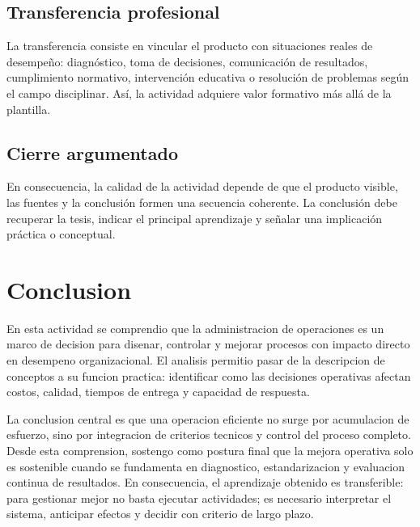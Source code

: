 \documentclass[
	spanish,
	letterpaper, oneside
]{article}
\begin{document}
\subsection*{Transferencia profesional}
La transferencia consiste en vincular el producto con situaciones reales de desempeño: diagnóstico, toma de decisiones, comunicación de resultados, cumplimiento normativo, intervención educativa o resolución de problemas según el campo disciplinar. Así, la actividad adquiere valor formativo más allá de la plantilla.

\subsection*{Cierre argumentado}
En consecuencia, la calidad de la actividad depende de que el producto visible, las fuentes y la conclusión formen una secuencia coherente. La conclusión debe recuperar la tesis, indicar el principal aprendizaje y señalar una implicación práctica o conceptual.


\section{Conclusion}

En esta actividad se comprendio que la administracion de operaciones es un marco de decision para disenar, controlar y mejorar procesos con impacto directo en desempeno organizacional. El analisis permitio pasar de la descripcion de conceptos a su funcion practica: identificar como las decisiones operativas afectan costos, calidad, tiempos de entrega y capacidad de respuesta.

La conclusion central es que una operacion eficiente no surge por acumulacion de esfuerzo, sino por integracion de criterios tecnicos y control del proceso completo. Desde esta comprension, sostengo como postura final que la mejora operativa solo es sostenible cuando se fundamenta en diagnostico, estandarizacion y evaluacion continua de resultados. En consecuencia, el aprendizaje obtenido es transferible: para gestionar mejor no basta ejecutar actividades; es necesario interpretar el sistema, anticipar efectos y decidir con criterio de largo plazo.
\end{document}
